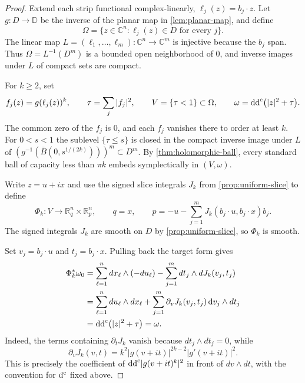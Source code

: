 \begin{proof}
Extend each strip functional complex-linearly, $\ell_j(z)=b_j\cdot z$. Let $g:D\to\mathbb D$ be the inverse of the planar map in \cref{lem:planar-map}, and define
\begin{equation}\label{eq:strip-domain}
 \Omega=\{z\in\mathbb{C}^n:\ell_j(z)\in D\text{ for every }j\}.
\end{equation}
The linear map $L=(\ell_1,\ldots,\ell_m):\mathbb C^n\to\mathbb C^m$ is injective because the $b_j$ span. Thus $\Omega=L^{-1}(D^m)$ is a bounded open neighborhood of $0$, and inverse images under $L$ of compact sets are compact.

For $k\ge2$, set
\[
 f_j(z)=g(\ell_j(z))^k,\qquad
 \tau=\sum_j|f_j|^2,\qquad V=\{\tau<1\}\subset\Omega,\qquad
 \omega=\mathrm{dd}^{\mathrm{c}}\bigl(|z|^2+\tau\bigr).
\]
The common zero of the $f_j$ is $0$, and each $f_j$ vanishes there to order at least $k$. For $0<s<1$ the sublevel $\{\tau\le s\}$ is closed in the compact inverse image under $L$ of $(g^{-1}(\overline B(0,s^{1/(2k)})))^m\subset D^m$. By \cref{thm:holomorphic-ball}, every standard ball of capacity less than $\pi k$ embeds symplectically in $(V,\omega)$.

Write $z=u+ix$ and use the signed slice integrals $J_k$ from \cref{prop:uniform-slice} to define
\begin{equation}\label{eq:strip-phase-map}
 \Phi_k:V\longrightarrow\mathbb{R}^n_q\times\mathbb{R}^n_p,
 \qquad
 q=x,\qquad
 p=-u-\sum_{j=1}^m
       J_k(b_j\cdot u,b_j\cdot x)b_j.
\end{equation}
The signed integrals $J_k$ are smooth on $D$ by \cref{prop:uniform-slice}, so $\Phi_k$ is smooth.

Set $v_j=b_j\cdot u$ and $t_j=b_j\cdot x$. Pulling back the target form gives
\begin{align}
 \Phi_k^*\omega_0
 &=\sum_{\ell=1}^n dx_\ell\wedge(-du_\ell)
       -\sum_{j=1}^m dt_j\wedge dJ_k(v_j,t_j)\notag\\
 &=\sum_{\ell=1}^n du_\ell\wedge dx_\ell
       +\sum_{j=1}^m
          \partial_vJ_k(v_j,t_j)\,\mathrm{d} v_j\wedge dt_j\notag\\
 &=\mathrm{dd}^{\mathrm{c}}\bigl(|z|^2+\tau\bigr)=\omega.
 \label{eq:strip-pullback}
\end{align}
Indeed, the terms containing $\partial_tJ_k$ vanish because $dt_j\wedge dt_j=0$, while
\[
 \partial_vJ_k(v,t)=k^2|g(v+it)|^{2k-2}|g'(v+it)|^2.
\]
This is precisely the coefficient of $\mathrm{dd}^{\mathrm{c}}|g(v+it)^k|^2$ in front of $dv\wedge dt$, with the convention for $\mathrm{d}^{\mathrm{c}}$ fixed above.


\end{proof}

